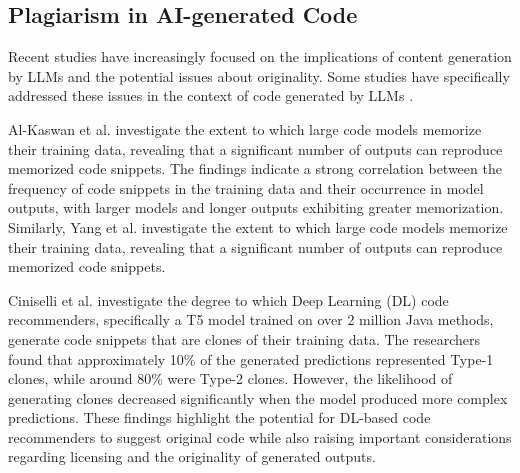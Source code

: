 
\subsection{Plagiarism in AI-generated Code}
Recent studies have increasingly focused on the implications of content generation by LLMs and the potential issues about originality. Some studies have specifically addressed these issues in the context of code generated by LLMs \cite{AlKaswan:TracesMemorisation:ICSE:2024,Yang:UnveilingMemorization:ICSE:2024,Ciniselli:CloningCode:ICPC:2022,Yu:codeipprompt:ICML:2023}. 

Al-Kaswan et al. \cite{AlKaswan:TracesMemorisation:ICSE:2024} investigate the extent to which large code models memorize their training data, revealing that a significant number of outputs can reproduce memorized code snippets. The findings indicate a strong correlation between the frequency of code snippets in the training data and their occurrence in model outputs, with larger models and longer outputs exhibiting greater memorization. %
Similarly,  Yang et al. \cite{Yang:UnveilingMemorization:ICSE:2024} investigate the extent to which large code models memorize their training data, revealing that a significant number of outputs can reproduce memorized code snippets. 

Ciniselli et al. \cite{Ciniselli:CloningCode:ICPC:2022} investigate the degree to which Deep Learning (DL) code recommenders, specifically a T5 model trained on over 2 million Java methods, generate code snippets that are clones of their training data. %
The researchers found that approximately 10\% of the generated predictions represented Type-1 clones, while around 80\% were Type-2 clones. However, the likelihood of generating clones decreased significantly when the model produced more complex predictions. %
These findings highlight the potential for DL-based code recommenders to suggest original code while also raising important considerations regarding licensing and the originality of generated outputs.


